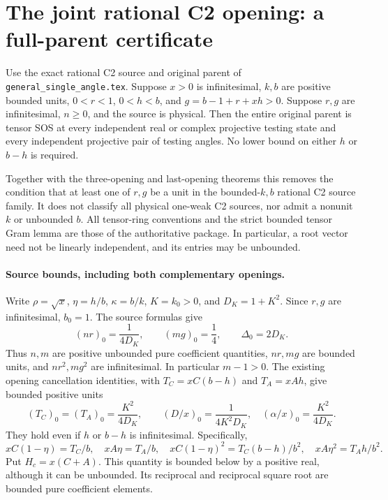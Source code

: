 \section[The joint rational C2 opening: a full-parent certificate]{The joint rational C2 opening: a full-parent certificate}
\label{sec:c2-joint-centered}

\begin{theorem}
Use the exact rational C2 source and original parent of
\texttt{general\_single\_angle.tex}.  Suppose $x>0$ is infinitesimal,
$k,b$ are positive bounded units, $0<r<1$, $0<h<b$, and
$g=b-1+r+xh>0$.  Suppose $r,g$ are infinitesimal, $n\geq0$, and
the source is physical.  Then the entire original parent is tensor
SOS at every independent real or complex projective testing state
and every independent projective pair of testing angles.  No lower
bound on either $h$ or $b-h$ is required.
\end{theorem}

Together with the three-opening and last-opening theorems this
removes the condition that at least one of $r,g$ be a unit in the
bounded-$k,b$ rational C2 source family.  It does not classify all
physical one-weak C2 sources, nor admit a nonunit $k$ or unbounded $b$.
All tensor-ring conventions and the strict bounded tensor Gram lemma
are those of the authoritative package.  In particular, a root vector
need not be linearly independent, and its entries may be unbounded.

\paragraph{Source bounds, including both complementary openings.}
Write $\rho=\sqrt{x}$, $\eta=h/b$, $\kappa=b/k$, $K=k_0>0$,
and $D_K=1+K^2$.  Since $r,g$ are infinitesimal, $b_0=1$.
The source formulas give
\[
 (nr)_0=\frac1{4D_K},\qquad (mg)_0=\frac14,
 \qquad \Delta_0=2D_K.
\]
Thus $n,m$ are positive unbounded pure coefficient quantities,
$nr,mg$ are bounded units, and $nr^2,mg^2$ are infinitesimal.
In particular $m-1>0$.  The existing opening cancellation identities,
with $T_C=xC(b-h)$ and $T_A=xAh$, give bounded positive units
\[
 (T_C)_0=(T_A)_0=\frac{K^2}{4D_K},\qquad
 (D/x)_0=\frac1{4K^2D_K},\quad
 (\alpha/x)_0=\frac{K^2}{4D_K}.
\]
They hold even if $h$ or $b-h$ is infinitesimal.  Specifically,
\[
 xC(1-\eta)=T_C/b,\quad xA\eta=T_A/b,\quad
 xC(1-\eta)^2=T_C(b-h)/b^2,\quad
 xA\eta^2=T_Ah/b^2.                                  \tag{JC1}
\]
Put $H_c=x(C+A)$.  This quantity is bounded below by a positive
real, although it can be unbounded.  Its reciprocal and reciprocal
square root are bounded pure coefficient elements.

